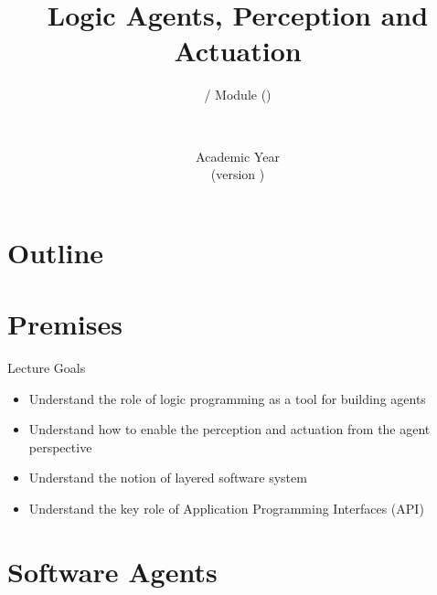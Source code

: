 \documentclass[presentation]{beamer}\mode<presentation>{\usetheme{AMSBolognaFC}}
\title[\currentLab{} -- Logic Agents]{Logic Agents, Perception and Actuation}
\subtitle{\courseName{} / Module \moduleN{} (\courseAcronym)}
\author[\sspeaker{\gcShort}]{\speaker{\gcFull} \\ \gcEmail}
\institute[\disiShort, \uniboShort]{\disi{} (\disiShort)\\\unibo}
\date[A.Y. \academicYear{} (v.\ \version)]{Academic Year \academicYear{}\\(version \version)}
\begin{document}

\frame{\titlepage}

\section*{Outline}
%
\frame[c]{\tableofcontents[hideallsubsections]}

\section{Premises}

\begin{frame}{Lecture Goals}
    \begin{itemize}
        \item Understand the role of logic programming as a tool for building agents
        \item Understand how to enable the perception and actuation from the agent perspective
        \item Understand the notion of layered software system
        \item Understand the key role of Application Programming Interfaces (API)
    \end{itemize}
\end{frame}

\section{Software Agents}
\end{document}
